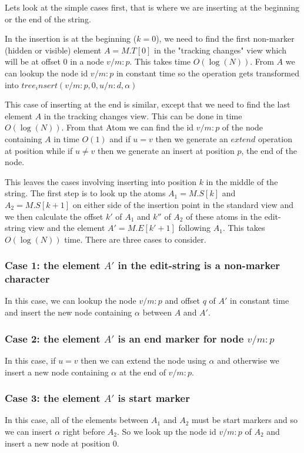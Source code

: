 \documentclass{amsart}
\begin{document}
Lets look at the simple cases first, that is where we are inserting at the
beginning or the end of the string. 

In the insertion is at the beginning ($k=0$), we need to find the first non-marker (hidden or visible) element $A=M.T[0]$ in the "tracking changes" view which will be at offset 0 in a node $v/m:p$. This takes time $O(\log(N))$.
From $A$ we can lookup the node id $v/m:p$ in constant time so the operation gets transformed into 
$tree_insert(v/m:p,0,u/n:d,\alpha)$
 
This case of inserting at the end is similar, except that we need to find the last element $A$ in the tracking changes view. This can be done in time $O(\log(N))$. From that Atom we can find the
id $v/m:p$ of the node containing $A$ in time $O(1)$ and if $u=v$ then we generate an 
$extend$ operation at position while if $u\ne v$ then we generate an insert at position $p$, the end of the node. 

This leaves the cases involving inserting into position $k$ in the middle of the string.
The first step is to look up the atoms $A_1=M.S[k]$ and $A_2=M.S[k+1]$ on either side of
the insertion point in the standard view and we then calculate the offset $k'$ of $A_1$ and $k''$ of $A_2$ of these atoms in the edit-string view and
the element $A' = M.E[k'+1]$ following $A_1$. This takes
$O(\log(N))$ time. There are three cases to consider.

\subsubsection{Case 1: the element $A'$ in the edit-string is a non-marker character}
In this case, we can lookup the node $v/m:p$ and offset $q$ of $A'$ in constant time and insert the new node containing $\alpha$ between $A$ and $A'$.

\subsubsection{Case 2: the element $A'$ is an end marker for node $v/m:p$}
In this case, if $u=v$ then we can extend the node using $\alpha$ and otherwise
we insert a new node containing $\alpha$ at the end of $v/m:p$.

\subsubsection{Case 3: the element $A'$ is start marker}
In this case, all of the elements between $A_1$ and $A_2$ must be start markers
and so we can insert $\alpha$ right before $A_2$.  So we look up the node id $v/m:p$ of $A_2$ and insert a new node at position $0$.
\end{document}
